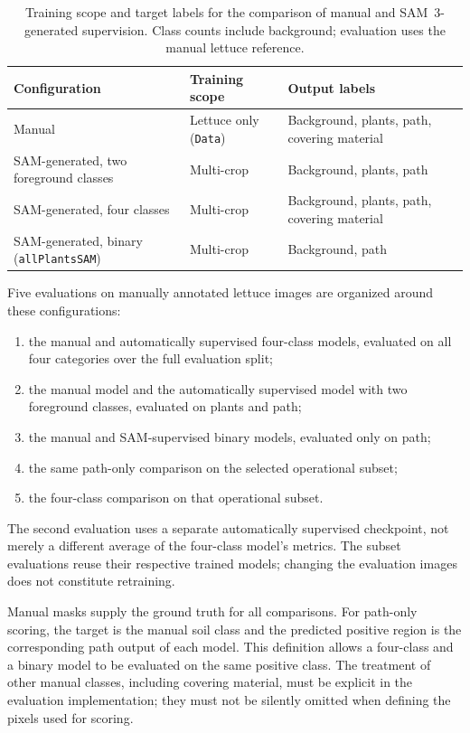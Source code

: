\begin{table}[htbp]
    \centering
    \small
    \caption{Training scope and target labels for the comparison of manual
    and SAM~3-generated supervision. Class counts include background;
    evaluation uses the manual lettuce reference.}
    \label{tab:c3_supervision_configurations}
    \begin{tabularx}{\textwidth}{@{}X X X@{}}
        \toprule
        Configuration & Training scope & Output labels \\
        \midrule
        Manual & Lettuce only (\texttt{Data}) &
        Background, plants, path, covering material \\
        SAM-generated, two foreground classes &
        Multi-crop & Background, plants, path \\
        SAM-generated, four classes &
        Multi-crop & Background, plants, path, covering material \\
        SAM-generated, binary (\texttt{allPlantsSAM}) &
        Multi-crop & Background, path \\
        \bottomrule
    \end{tabularx}
\end{table}

Five evaluations on manually annotated lettuce images are organized
around these configurations:
\begin{enumerate}
    \item the manual and automatically supervised four-class models,
    evaluated on all four categories over the full evaluation split;
    \item the manual model and the automatically supervised model with
    two foreground classes, evaluated on plants and path;
    \item the manual and SAM-supervised binary models, evaluated only on path;
    \item the same path-only comparison on the selected operational subset;
    \item the four-class comparison on that operational subset.
\end{enumerate}
The second evaluation uses a separate automatically supervised
checkpoint, not merely a different average of the four-class model's
metrics. The subset evaluations reuse their respective trained models;
changing the evaluation images does not constitute retraining.

Manual masks supply the ground truth for all comparisons. For path-only
scoring, the target is the manual soil class and the predicted positive
region is the corresponding path output of each model. This definition
allows a four-class and a binary model to be evaluated on the same
positive class. The treatment of other manual classes, including covering
material, must be explicit in the evaluation implementation; they must
not be silently omitted when defining the pixels used for scoring.

